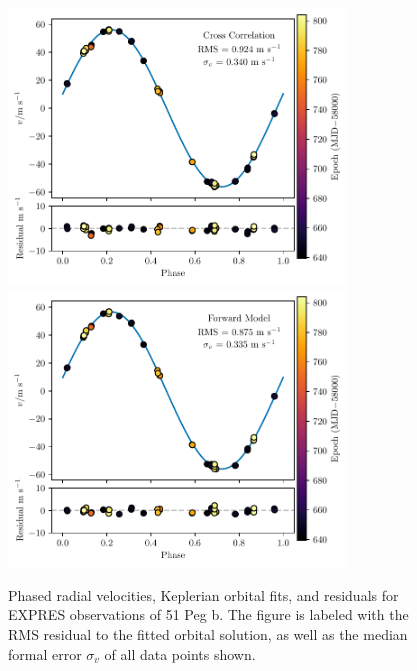 \begin{figure}[htbp]
    \centering
    \includegraphics[width=0.8\textwidth]{figures-4/217014_ccf.pdf}
    \includegraphics[width=0.8\textwidth]{figures-4/217014_cbc.pdf}
    \caption[51 Peg b -- radial velocities and Keplerian orbital fits]{Phased radial velocities, Keplerian orbital fits, and residuals for EXPRES observations of 51 Peg b. The figure is labeled with the RMS residual to the fitted orbital solution, as well as the median formal error $\sigma_v$ of all data points shown.}
    \label{fig:217014}
\end{figure}

